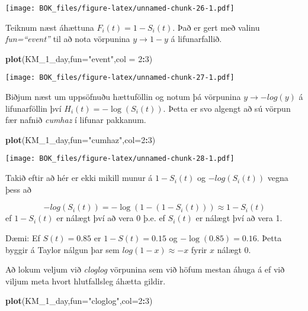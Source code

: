 \documentclass[
]{book}
\newenvironment{Shaded}{\begin{snugshade}}{\end{snugshade}}
\newcommand{\DataTypeTok}[1]{\textcolor[rgb]{0.13,0.29,0.53}{#1}}
\newcommand{\DecValTok}[1]{\textcolor[rgb]{0.00,0.00,0.81}{#1}}
\newcommand{\KeywordTok}[1]{\textcolor[rgb]{0.13,0.29,0.53}{\textbf{#1}}}
\newcommand{\NormalTok}[1]{#1}
\newcommand{\OperatorTok}[1]{\textcolor[rgb]{0.81,0.36,0.00}{\textbf{#1}}}
\newcommand{\StringTok}[1]{\textcolor[rgb]{0.31,0.60,0.02}{#1}}
\begin{document}
\texttt{[image: BOK\_files/figure-latex/unnamed-chunk-26-1.pdf]}

Teiknum næst áhættuna \(F_i(t)=1-S_i(t)\). Það er gert með valinu \emph{fun=``event''} til að nota vörpunina \(y \to 1-y\) á lifunarfallið.

\begin{Shaded}
\begin{Highlighting}[]
\KeywordTok{plot}\NormalTok{(KM\_}\DecValTok{1}\NormalTok{\_day,}\DataTypeTok{fun=}\StringTok{"event"}\NormalTok{,}\DataTypeTok{col =} \DecValTok{2}\OperatorTok{:}\DecValTok{3}\NormalTok{)}
\end{Highlighting}
\end{Shaded}

\texttt{[image: BOK\_files/figure-latex/unnamed-chunk-27-1.pdf]}

Biðjum næst um uppsöfnuðu hættuföllin og notum þá vörpunina \(y \to -log(y)\) á lifunarföllin því \(H_i(t) = -\log(S_i(t))\). Þetta er svo algengt að sú vörpun fær nafnið \emph{cumhaz} í lifunar pakkanum.

\begin{Shaded}
\begin{Highlighting}[]
\KeywordTok{plot}\NormalTok{(KM\_}\DecValTok{1}\NormalTok{\_day,}\DataTypeTok{fun=}\StringTok{"cumhaz"}\NormalTok{,}\DataTypeTok{col=}\DecValTok{2}\OperatorTok{:}\DecValTok{3}\NormalTok{)}
\end{Highlighting}
\end{Shaded}

\texttt{[image: BOK\_files/figure-latex/unnamed-chunk-28-1.pdf]}

Takið eftir að hér er ekki mikill munur á \(1-S_i(t)\) og \(-log(S_i(t))\) vegna þess að

\[
-log(S_i(t))=-\log(1-(1-S_i(t))) \approx 1-S_i(t)
\]
ef \(1-S_i(t)\) er nálægt því að vera 0 þ.e. ef \(S_i(t)\) er nálægt því að vera 1.

Dæmi: Ef \(S(t)=0.85\) er \(1-S(t)=0.15\) og \(-\log(0.85)=0.16\). Þetta byggir á Taylor nálgun þar sem \(log(1-x) \approx -x\) fyrir \(x\) nálægt 0.

Að lokum veljum við \emph{cloglog} vörpunina sem við höfum mestan áhuga á ef við viljum meta hvort hlutfallsleg áhætta gildir.

\begin{Shaded}
\begin{Highlighting}[]
\KeywordTok{plot}\NormalTok{(KM\_}\DecValTok{1}\NormalTok{\_day,}\DataTypeTok{fun=}\StringTok{"cloglog"}\NormalTok{,}\DataTypeTok{col=}\DecValTok{2}\OperatorTok{:}\DecValTok{3}\NormalTok{)}
\end{Highlighting}
\end{Shaded}
\end{document}
